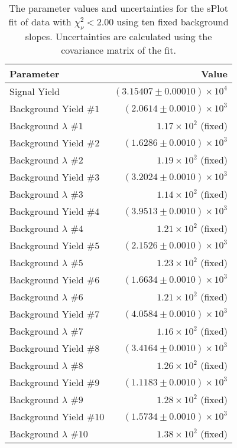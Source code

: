 
\begin{table}[ht]
    \begin{center}
        \begin{tabular}{lr}\toprule
            Parameter & Value \\\midrule
            Signal Yield & $(3.15407 \pm 0.00010) \times 10^{4}$ \\
            Background Yield $\#1$ & $(2.0614 \pm 0.0010) \times 10^{3}$ \\
            Background $\lambda$ $\#1$ & $1.17 \times 10^{2}$ (fixed) \\
            Background Yield $\#2$ & $(1.6286 \pm 0.0010) \times 10^{3}$ \\
            Background $\lambda$ $\#2$ & $1.19 \times 10^{2}$ (fixed) \\
            Background Yield $\#3$ & $(3.2024 \pm 0.0010) \times 10^{3}$ \\
            Background $\lambda$ $\#3$ & $1.14 \times 10^{2}$ (fixed) \\
            Background Yield $\#4$ & $(3.9513 \pm 0.0010) \times 10^{3}$ \\
            Background $\lambda$ $\#4$ & $1.21 \times 10^{2}$ (fixed) \\
            Background Yield $\#5$ & $(2.1526 \pm 0.0010) \times 10^{3}$ \\
            Background $\lambda$ $\#5$ & $1.23 \times 10^{2}$ (fixed) \\
            Background Yield $\#6$ & $(1.6634 \pm 0.0010) \times 10^{3}$ \\
            Background $\lambda$ $\#6$ & $1.21 \times 10^{2}$ (fixed) \\
            Background Yield $\#7$ & $(4.0584 \pm 0.0010) \times 10^{3}$ \\
            Background $\lambda$ $\#7$ & $1.16 \times 10^{2}$ (fixed) \\
            Background Yield $\#8$ & $(3.4164 \pm 0.0010) \times 10^{3}$ \\
            Background $\lambda$ $\#8$ & $1.26 \times 10^{2}$ (fixed) \\
            Background Yield $\#9$ & $(1.1183 \pm 0.0010) \times 10^{3}$ \\
            Background $\lambda$ $\#9$ & $1.28 \times 10^{2}$ (fixed) \\
            Background Yield $\#10$ & $(1.5734 \pm 0.0010) \times 10^{3}$ \\
            Background $\lambda$ $\#10$ & $1.38 \times 10^{2}$ (fixed) \\\bottomrule
        \end{tabular}
        \caption{The parameter values and uncertainties for the sPlot fit of data with $\chi^2_\nu < 2.00$ using ten fixed background slopes. Uncertainties are calculated using the covariance matrix of the fit.}\label{tab:splot-fit-results-chisqdof-2.00-fixed-10}
    \end{center}
\end{table}
